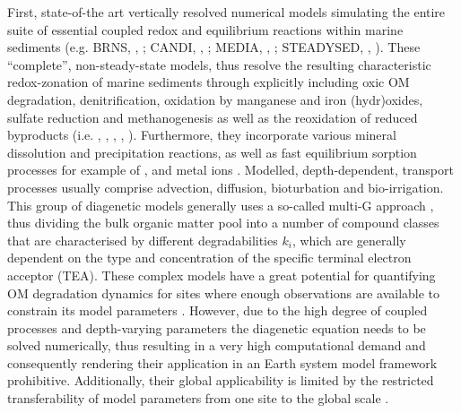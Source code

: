 \documentclass[gmd, manuscript]{copernicus}
\begin{document}
First, state-of-the art vertically resolved numerical models simulating the entire suite of essential coupled redox and equilibrium reactions within marine sediments %
(e.g. BRNS, \citeauthor{aguilera_knowledge-based_2005}, \citeyear{aguilera_knowledge-based_2005}; 
CANDI, \citeauthor{boudreau_method--lines_1996}, \citeyear{boudreau_method--lines_1996}; MEDIA, \citeauthor{meysman_reactive_2003}, \citeyear{meysman_reactive_2003}; 
STEADYSED, \citeauthor{cappellen_cycling_1996}, \citeyear{cappellen_cycling_1996}). 
These ``complete'', non-steady-state models, thus resolve the resulting characteristic redox-zonation of marine sediments through explicitly including oxic OM degradation, 
denitrification, oxidation by manganese and iron (hydr)oxides, sulfate reduction and methanogenesis as well as the reoxidation of reduced byproducts %
(i.e. , , , , ). 
Furthermore, they incorporate various mineral dissolution and precipitation reactions, as well as fast equilibrium sorption processes for example of 
,  and metal ions \citep[i.e. ,  and , compare][]{cappellen_cycling_1996, meysman_reactive_2003}. 
Modelled, depth-dependent, transport processes usually comprise advection, diffusion, bioturbation and bio-irrigation.   
This group of diagenetic models generally uses a so-called multi-G approach \citep{joergensen_comparison_1978_2, berner_early_1980}, thus dividing the bulk organic 
matter pool into a number of compound classes that are characterised by different degradabilities $k_i$, which are generally dependent on the type and concentration 
of the specific terminal electron acceptor (TEA). 
These complex models have a great potential for quantifying OM degradation dynamics for sites where enough observations are available to constrain its model 
parameters \citep[see e.g.][for applications]{boudreau_comparative_1998, wang_multicomponent_1996, thullner_global_scale_2009}. 
However, due to the high degree of coupled processes and depth-varying parameters the diagenetic equation needs to be %
solved numerically, thus resulting in a very high computational demand and consequently rendering their application in an Earth system model framework prohibitive. 
Additionally, their global applicability is limited by the restricted transferability of model parameters from one site to the global scale \citep{arndt_quantifying_2013}. 
\end{document}
